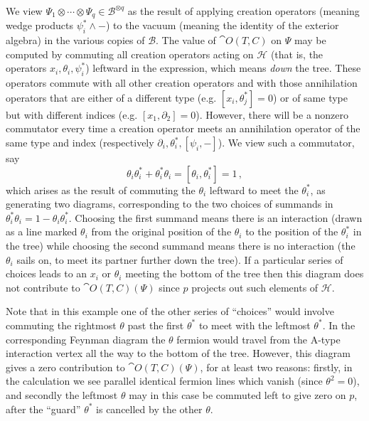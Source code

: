 \documentclass[english,letter paper,12pt,leqno]{article}
\theoremstyle{example}
\numberwithin{equation}{section}
\begin{document}
We view $\Psi_1 \otimes \cdots \otimes \Psi_q \in \mathscr{B}^{\otimes q}$ as the result of applying creation operators (meaning wedge products $\psi_i^* \wedge -$) to the vacuum (meaning the identity of the exterior algebra) in the various copies of $\mathscr{B}$. The value of $\cat{O}(T,C)$ on $\Psi$ may be computed by commuting all creation operators acting on $\mathscr{H}$ (that is, the operators $x_i, \theta_i, \psi_i^*$) leftward in the expression, which means \emph{down} the tree. These operators commute with all other creation operators and with those annihilation operators that are either of a different type (e.g. $[x_i, \theta_j^*] = 0$) or of same type but with different indices (e.g. $[x_1, \partial_2] = 0$). However, there will be a nonzero commutator every time a creation operator meets an annihilation operator of the same type and index (respectively $\partial_i, \theta_i^*, [\psi_i, -]$). We view such a commutator, say
\[
\theta_i \theta_i^* + \theta_i^* \theta_i = [ \theta_i, \theta_i^* ] = 1\,,
\]
which arises as the result of commuting the $\theta_i$ leftward to meet the $\theta_i^*$, as generating two diagrams, corresponding to the two choices of summands in $\theta_i^* \theta_i = 1 - \theta_i \theta_i^*$. Choosing the first summand means there is an interaction (drawn as a line marked $\theta_i$ from the original position of the $\theta_i$ to the position of the $\theta_i^*$ in the tree) while choosing the second summand means there is no interaction (the $\theta_i$ sails on, to meet its partner further down the tree). If a particular series of choices leads to an $x_i$ or $\theta_i$ meeting the bottom of the tree then this diagram does not contribute to $\cat{O}(T,C)(\Psi)$ since $p$ projects out such elements of $\mathscr{H}$. 

Note that in this example one of the other series of ``choices'' would involve commuting the rightmost $\theta$ past the first $\theta^*$ to meet with the leftmost $\theta^*$. In the corresponding Feynman diagram the $\theta$ fermion would travel from the A-type interaction vertex all the way to the bottom of the tree. However, this diagram gives a zero contribution to $\cat{O}(T,C)(\Psi)$, for at least two reasons: firstly, in the calculation we see parallel identical fermion lines which vanish (since $\theta^2 = 0$), and secondly the leftmost $\theta$ may in this case be commuted left to give zero on $p$, after the ``guard'' $\theta^*$ is cancelled by the other $\theta$.
\end{document}
